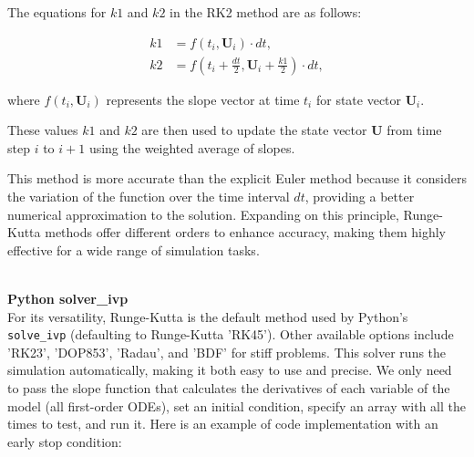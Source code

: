 \documentclass[runningheads]{llncs}
\begin{document}
The equations for \( k1 \) and \( k2 \) in the RK2 method are as follows:

\[
\begin{aligned}
k1 & = f(t_i, \mathbf{U}_i) \cdot dt, \\
k2 & = f(t_i + \frac{dt}{2}, \mathbf{U}_i + \frac{k1}{2}) \cdot dt,
\end{aligned}
\]

where \( f(t_i, \mathbf{U}_i) \) represents the slope vector at time \( t_i \) for state vector \( \mathbf{U}_i \).

These values \( k1 \) and \( k2 \) are then used to update the state vector \( \mathbf{U} \) from time step \( i \) to \( i+1 \) using the weighted average of slopes.

This method is more accurate than the explicit Euler method because it considers the variation of the function over the time interval \( dt \), providing a better numerical approximation to the solution. Expanding on this principle, Runge-Kutta methods offer different orders to enhance accuracy, making them highly effective for a wide range of simulation tasks.


\textbf{\\Python solver\_ivp\\}
For its versatility, Runge-Kutta is the default method used by Python's \texttt{solve\_ivp} (defaulting to Runge-Kutta 'RK45'). Other available options include 'RK23', 'DOP853', 'Radau', and 'BDF' for stiff problems. This solver runs the simulation automatically, making it both easy to use and precise. We only need to pass the slope function that calculates the derivatives of each variable of the model (all first-order ODEs), set an initial condition, specify an array with all the times to test, and run it. Here is an example of code implementation with an early stop condition:
\end{document}
